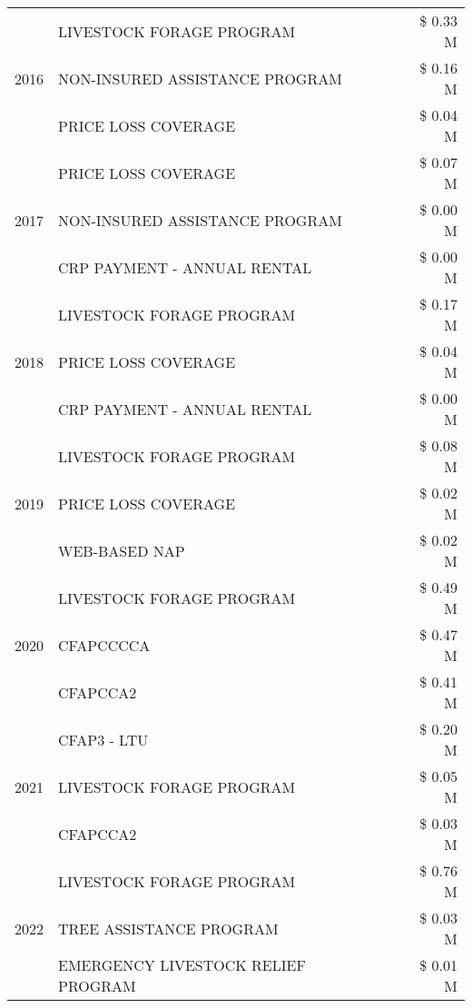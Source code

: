 \begin{tabular}{llr}
\cline{1-3}
\multirow[t]{3}{*}{2016} & LIVESTOCK FORAGE PROGRAM & \$ 0.33 M \\
 & NON-INSURED ASSISTANCE PROGRAM & \$ 0.16 M \\
 & PRICE LOSS COVERAGE & \$ 0.04 M \\
\cline{1-3}
\multirow[t]{3}{*}{2017} & PRICE LOSS COVERAGE & \$ 0.07 M \\
 & NON-INSURED ASSISTANCE PROGRAM & \$ 0.00 M \\
 & CRP PAYMENT - ANNUAL RENTAL & \$ 0.00 M \\
\cline{1-3}
\multirow[t]{3}{*}{2018} & LIVESTOCK FORAGE PROGRAM & \$ 0.17 M \\
 & PRICE LOSS COVERAGE & \$ 0.04 M \\
 & CRP PAYMENT - ANNUAL RENTAL & \$ 0.00 M \\
\cline{1-3}
\multirow[t]{3}{*}{2019} & LIVESTOCK FORAGE PROGRAM & \$ 0.08 M \\
 & PRICE LOSS COVERAGE & \$ 0.02 M \\
 & WEB-BASED NAP & \$ 0.02 M \\
\cline{1-3}
\multirow[t]{3}{*}{2020} & LIVESTOCK FORAGE PROGRAM & \$ 0.49 M \\
 & CFAPCCCCA & \$ 0.47 M \\
 & CFAPCCA2 & \$ 0.41 M \\
\cline{1-3}
\multirow[t]{3}{*}{2021} & CFAP3 - LTU & \$ 0.20 M \\
 & LIVESTOCK FORAGE PROGRAM & \$ 0.05 M \\
 & CFAPCCA2 & \$ 0.03 M \\
\cline{1-3}
\multirow[t]{3}{*}{2022} & LIVESTOCK FORAGE PROGRAM & \$ 0.76 M \\
 & TREE ASSISTANCE PROGRAM & \$ 0.03 M \\
 & EMERGENCY LIVESTOCK RELIEF PROGRAM & \$ 0.01 M \\
\cline{1-3}
\bottomrule
\end{tabular}
